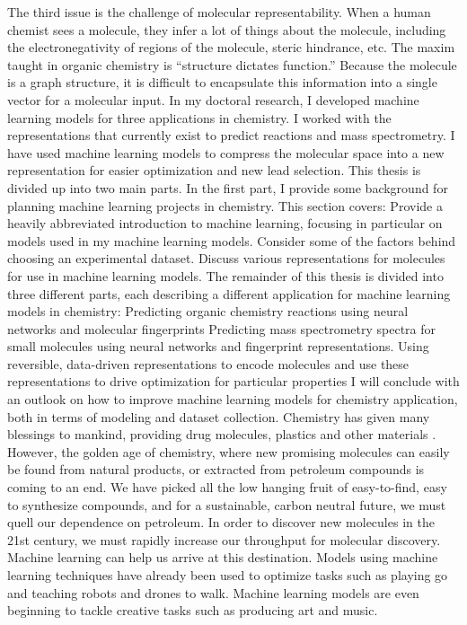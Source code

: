 The third issue is the challenge of molecular representability. When a human chemist sees a molecule, they infer a lot of things about the molecule, including the electronegativity of regions of the molecule, steric hindrance, etc. The maxim taught in organic chemistry is “structure dictates function.” Because the molecule is a graph structure, it is difficult to encapsulate this information into a single vector for a molecular input.
In my doctoral research, I developed machine learning models for three applications in chemistry. I worked with the representations that currently exist to predict reactions and mass spectrometry. I have used machine learning models to compress the molecular space into a new representation for easier optimization and new lead selection.
This thesis is divided up into two main parts. In the first part, I provide some background for planning machine learning projects in chemistry. This section covers:
Provide a heavily abbreviated introduction to machine learning, focusing in particular on models used in my machine learning models.
Consider some of the factors behind choosing an experimental dataset.
Discuss various representations for molecules for use in machine learning models.
The remainder of this thesis is divided into three different parts, each describing a different application for machine learning models in chemistry: 
Predicting organic chemistry reactions using neural networks and molecular fingerprints
Predicting mass spectrometry spectra for small molecules using neural networks and fingerprint representations.
Using reversible, data-driven representations to encode molecules and use these representations to drive optimization for particular properties
I will conclude with an outlook on how to improve machine learning models for chemistry application, both in terms of modeling and dataset collection.
Chemistry has given many blessings to mankind, providing drug molecules, plastics and other materials \cite{Napolean's buttons}. However, the golden age of chemistry, where new promising molecules can easily be found from natural products, or extracted from petroleum compounds is coming to an end. We have picked all the low hanging fruit of easy-to-find, easy to synthesize compounds, and for a sustainable, carbon neutral future, we must quell our dependence on petroleum.
In order to discover new molecules in the 21st century, we must rapidly increase our throughput for molecular discovery. Machine learning can help us arrive at this destination. Models using machine learning techniques have already been used to optimize tasks such as playing go and teaching robots and drones to walk. Machine learning models are even beginning to tackle creative tasks such as producing art and music. 
